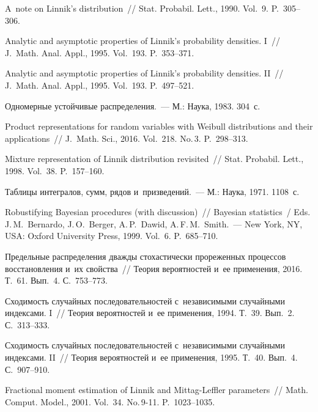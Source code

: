 \begin{multicols}{2}
{{\begin{thebibliography}{99}
 A~note on Linnik's distribution~// Stat. 
Probabil. Lett., 1990. Vol.~9. P.~305--306.

 Analytic and asymptotic
properties of Linnik's probability densities. I~// J.~Math. Anal. Appl., 1995. 
Vol.~193. P.~353--371.

 Analytic and asymptotic
properties of Linnik's probability densities. II~// J.~Math. Anal. Appl., 
1995. Vol.~193. P.~497--521.

 Одномерные устойчивые распределения.~--- М.: Наука, 1983.
304~с.

 Product representations
for random variables with Weibull distributions and their
applications~// J.~Math. Sci., 2016. Vol.~218. No.\,3. P.~298--313.

 Mixture representation of Linnik distribution
revisited~// Stat. Probabil. Lett., 1998. Vol.~38. P.~157--160.

Таблицы интегралов, сумм, рядов и~призведений.~--- М.: Наука, 1971. 1108~с.

 Robustifying
Bayesian procedures (with discussion)~// Bayesian statistics~/ Eds.
J.\,M.~Bernardo, J.\,O.~Berger, A.\,P.~Dawid, A.\,F.\,M.~Smith.~---
New York, NY, USA: Oxford University Press, 1999. Vol.~6. P.~685--710.

 Предельные распределения дважды стохастически
прореженных процессов восстановления и~их свойства~// Теория
вероятностей и~ее применения, 2016. Т.~61. Вып.~4. С.~753--773.

 Сходимость случайных
последовательностей с~независимыми случайными индексами. I~// Теория
вероятностей и~ее применения, 1994. Т.~39. Вып.~2. С.~313--333.

 Сходимость случайных
последовательностей с~независимыми случайными индексами. II~//
Теория вероятностей и~ее применения, 1995. Т.~40. Вып.~4. С.~907--910.

 Fractional moment estimation of Linnik
and Mittag-Leffler parameters~// Math. Comput.
Model., 2001. Vol.~34. No.\,9-11. P.~1023--1035.


\end{thebibliography}}}
\end{multicols}
